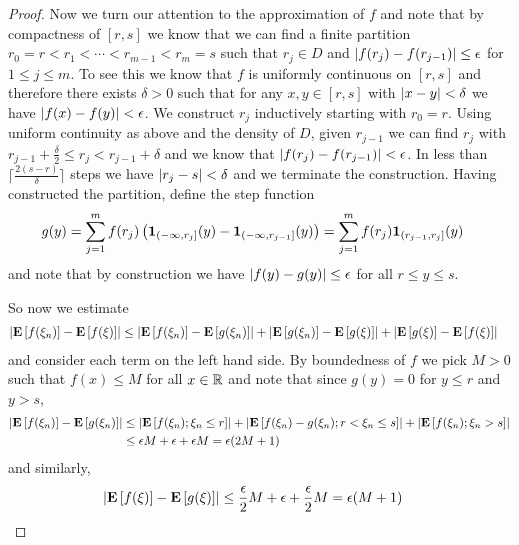 \begin{proof}
Now we turn our attention to the approximation of $f$ and note that by compactness of $[r,s]$ we know that
we can find a finite partition $r_0 = r < r_1 < \cdots < r_{m-1} <
r_m=s$ such that $r_j \in D$ and $\left \vert f(r_{j}) - f(r_{j-1}) \right \vert \leq
\epsilon$ for $1 \leq j \leq m$.  To see this we know that $f$ is
uniformly continuous on $[r,s]$ and therefore there exists $\delta >
0$ such that for any $x,y \in [r,s]$ with $\left \vert x -y \right \vert < \delta$ we
  have $\left \vert f(x) - f(y) \right \vert < \epsilon$.   We construct $r_j$
  inductively starting with $r_0 = r$.  Using uniform continuity as
  above and the density of $D$, given $r_{j-1}$ we can find $r_j$ with
  $r_{j-1}+\frac{\delta}{2} \leq r_j < r_{j-1} + \delta$ and we know
  that $\left \vert f(r_j) - f(r_{j-1}) \right \vert < \epsilon$.  In less than $\lceil
  \frac{2(s -r)}{\delta} \rceil$ steps we have $\left \vert r_j - s \right \vert <
  \delta$ and we terminate the construction.  Having constructed the
  partition, define the step
function 
\begin{align*}
g(y) &= \sum_{j=1}^m f(r_j) \left (\textbf{1}_{(-\infty,
    r_j]}(y) - \textbf{1}_{(-\infty,    r_{j-1}]}(y) \right ) =
\sum_{j=1}^m f(r_j) \textbf{1}_{(r_{j-1}, r_j]}(y)
\end{align*}
and note that by construction we have $\left \vert f(y) - g(y) \right \vert \leq \epsilon$
for all $r \leq y \leq s$.  

So now we estimate
\begin{align*}
\left \vert \textbf{E}\left[f(\xi_n)\right] - \textbf{E}\left[f(\xi)\right] \right \vert &\leq
\left \vert \textbf{E}\left[f(\xi_n)\right] - \textbf{E}\left[g(\xi_n)\right] \right \vert  +
\left \vert \textbf{E}\left[g(\xi_n)\right] - \textbf{E}\left[g(\xi)\right] \right \vert  + \left \vert \textbf{E}\left[g(\xi)\right] - \textbf{E}\left[f(\xi)\right] \right \vert 
\end{align*}
and consider each term on the left hand side.  By boundedness of $f$
we pick $M > 0$ such that $f(x) \leq M$ for all $x \in \mathbb{R}$ and
note that since $g(y) = 0$ for $y\leq r$ and $y > s$,
\begin{align*}
\left \vert \textbf{E}\left[f(\xi_n)\right] - \textbf{E}\left[g(\xi_n)\right] \right \vert &\leq
\left \vert \textbf{E}\left[f(\xi_n); \xi_n \leq r\right]  \right \vert +
\left \vert \textbf{E}\left[f(\xi_n)-g(\xi_n); r < \xi_n \leq s\right]  \right \vert +
\left \vert \textbf{E}\left[f(\xi_n); \xi_n > s\right]  \right \vert \\
&\leq \epsilon M + \epsilon + \epsilon M = \epsilon (2M +1)
\end{align*}
and similarly, 
\begin{align*}
\left \vert \textbf{E}\left[f(\xi)\right] - \textbf{E}\left[g(\xi)\right] \right \vert 
&\leq \frac{\epsilon}{2} M + \epsilon + \frac{\epsilon}{2} M =
\epsilon ( M + 1)
\end{align*}


\end{proof}
